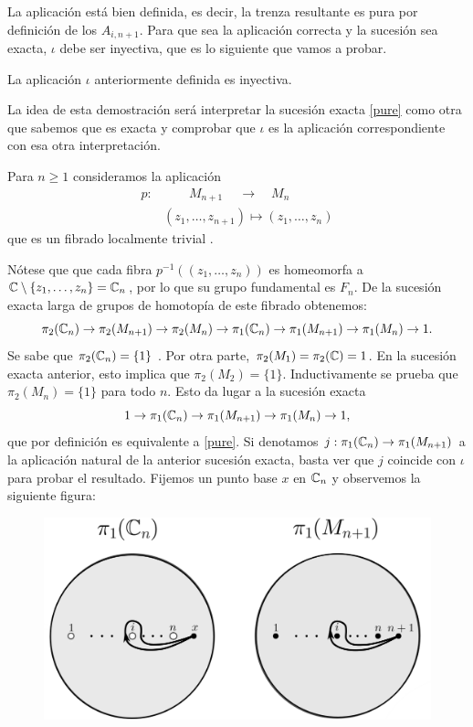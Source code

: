 \documentclass[TFG.tex]{subfiles}
\begin{document}
La aplicación está bien definida, es decir, la trenza resultante es pura por definición de los $A_{i,n+1}$. Para que sea la aplicación correcta y la sucesión sea exacta, $\iota$ debe ser inyectiva, que es lo siguiente que vamos a probar.
\begin{prop}\label{split}
La aplicación $\iota$ anteriormente definida es inyectiva.
\end{prop}
\begin{dem}
La idea de esta demostración será interpretar la sucesión exacta \ref{pure} como otra que sabemos que es exacta y comprobar que $\iota$ es la aplicación correspondiente con esa otra interpretación.

Para $n\geq 1$ consideramos la aplicación
\begin{align}\label{fibrado}
p: & \qquad M_{n+1}\ \quad \longrightarrow\quad M_n\\
&(z_1,\dots,z_{n+1})\mapsto (z_1,\dots,z_n)\nonumber
\end{align}
que es un fibrado localmente trivial \cite{Fadell}.

Nótese que que cada fibra $p^{-1}((z_1,\dots, z_n))$ es homeomorfa a $\mathbb{C}\setminus\{z_1,\dots, z_n\}=\mathbb{C}_n$, por lo que su grupo fundamental es $F_n$. De la sucesión exacta larga de grupos de homotopía \cite{Hatcher} de este fibrado obtenemos:
$$\pi_2(\mathbb{C}_n)\to\pi_2(M_{n+1})\to\pi_2(M_n)\to\pi_1(\mathbb{C}_n)\to\pi_1(M_{n+1})\to\pi_1(M_n)\to 1.$$
Se sabe que $\pi_2(\mathbb{C}_n)=\{1\}$ \cite{Hatcher}. Por otra parte, $\pi_2(M_1)=\pi_2(\mathbb{C})={1}$. En la sucesión exacta anterior, esto implica que $\pi_2(M_2)=\{1\}$. Inductivamente se prueba que $\pi_2(M_n)=\{1\}$ para todo $n$. Esto da lugar a la sucesión exacta
$$1\to\pi_1(\mathbb{C}_n)\to\pi_1(M_{n+1})\to\pi_1(M_n)\to 1,$$
que por definición es equivalente a \ref{pure}. Si denotamos $j:\pi_1(\mathbb{C}_n)\to\pi_1(M_{n+1})$ a la aplicación natural de la anterior sucesión exacta, basta ver que $j$ coincide con $\iota$ para probar el resultado. Fijemos un punto base $x$ en $\mathbb{C}_n$ y observemos la siguiente figura:

\begin{figure}[h!]
\includegraphics[scale=0.48]{Imagenes/inclusion.png}
\end{figure}


\end{dem}
\end{document}
